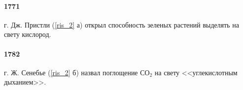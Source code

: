 
\paragraph*{1771} г. Дж. Пристли (\ris \ref{ris_2} а) открыл способность зеленых растений выделять на свету кислород.


\paragraph*{1782} г. Ж. Сенебье (\ris \ref{ris_2} б) назвал поглощение $СО_{2}$ на свету <<углекислотным дыханием>>.  



